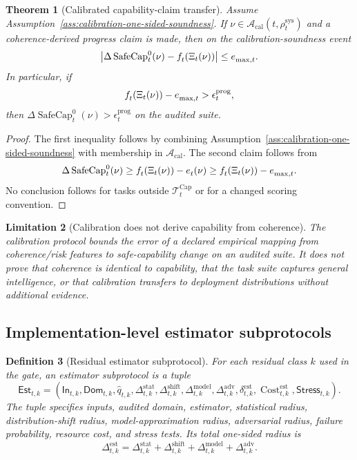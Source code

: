 \documentclass[11pt,a4paper]{article}
\newtheorem{theorem}{Theorem}[section]
\newtheorem{definition}[theorem]{Definition}
\newtheorem{limitation}[theorem]{Limitation}
\newcommand{\Acal}{\mathcal A}
\newcommand{\Tcal}{\mathcal T}
\newcommand{\calib}{\mathrm{cal}}
\newcommand{\adv}{\mathrm{adv}}
\newcommand{\shift}{\mathrm{shift}}
\newcommand{\sys}{\mathrm{sys}}
\providecommand{\Cap}{\operatorname{Cap}}
\newcommand{\SafeCap}{\operatorname{SafeCap}}
\newcommand{\Cost}{\operatorname{Cost}}
\newcommand{\stat}{\mathrm{stat}}
\newcommand{\model}{\mathrm{model}}
\newcommand{\est}{\mathrm{est}}
\begin{document}
\begin{theorem}[Calibrated capability-claim transfer]
\label{thm:calibrated-capability-transfer}
Assume Assumption~\ref{ass:calibration-one-sided-soundness}. If \(\nu\in\Acal_{\calib}(t,\rho_t^{\sys})\) and a coherence-derived progress claim is made, then on the calibration-soundness event
\[
\left|
\Delta\SafeCap_t^0(\nu)-f_t^{\cal}(\Xi_t(\nu))
\right|
\le e_{\max,t}^{\cal}.
\]
In particular, if
\[
f_t^{\cal}(\Xi_t(\nu))-e_{\max,t}^{\cal}>\epsilon_t^{\mathrm{prog}},
\]
then \(\Delta\SafeCap_t^0(\nu)>\epsilon_t^{\mathrm{prog}}\) on the audited suite.
\end{theorem}

\begin{proof}
The first inequality follows by combining Assumption~\ref{ass:calibration-one-sided-soundness} with membership in \(\Acal_{\calib}\). The second claim follows from
\[
\Delta\SafeCap_t^0(\nu)
\ge
f_t^{\cal}(\Xi_t(\nu))-e_t^{\cal}(\nu)
\ge
f_t^{\cal}(\Xi_t(\nu))-e_{\max,t}^{\cal}.
\]
No conclusion follows for tasks outside \(\Tcal_t^{\Cap}\) or for a changed scoring convention.
\end{proof}

\begin{limitation}[Calibration does not derive capability from coherence]
\label{lim:calibration-not-derivation}
The calibration protocol bounds the error of a declared empirical mapping from coherence/risk features to safe-capability change on an audited suite. It does not prove that coherence is identical to capability, that the task suite captures general intelligence, or that calibration transfers to deployment distributions without additional evidence.
\end{limitation}

\subsection{Implementation-level estimator subprotocols}

\begin{definition}[Residual estimator subprotocol]
\label{def:residual-estimator-subprotocol}
For each residual class \(k\) used in the gate, an estimator subprotocol is a tuple
\[
\mathsf{Est}_{t,k}=
(\mathsf{In}_{t,k},\mathsf{Dom}_{t,k},\widehat q_{t,k},
\Delta_{t,k}^{\stat},\Delta_{t,k}^{\shift},\Delta_{t,k}^{\model},\Delta_{t,k}^{\adv},
\delta_{t,k}^{\est},\Cost_{t,k}^{\est},\mathsf{Stress}_{t,k}).
\]
The tuple specifies inputs, audited domain, estimator, statistical radius, distribution-shift radius, model-approximation radius, adversarial radius, failure probability, resource cost, and stress tests. Its total one-sided radius is
\[
\Delta_{t,k}^{\est}=\Delta_{t,k}^{\stat}+\Delta_{t,k}^{\shift}+\Delta_{t,k}^{\model}+\Delta_{t,k}^{\adv}.
\]
\end{definition}
\end{document}
